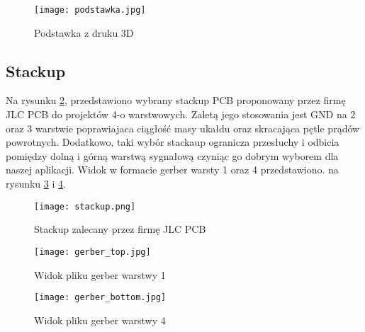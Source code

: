     \begin{figure}[H]
        \centering
        \texttt{[image: podstawka.jpg]}
        \caption{Podstawka z druku 3D}
        \label{fig:podstawka}
    \end{figure}
    
    
\subsection{Stackup}
    Na rysunku \ref{fig:stackup}, przedstawiono wybrany stackup PCB proponowany przez firmę JLC PCB do projektów 4-o warstwowych.
    Zaletą jego stosowania jest GND na 2 oraz 3 warstwie poprawiajaca ciągłość masy ukałdu oraz skracająca pętle
    prądów powrotnych. Dodatkowo, taki wybór stackaup ogranicza przesłuchy i odbicia pomiędzy dolną i górną warstwą sygnałową
    czyniąc go dobrym wyborem dla naszej aplikacji. Widok w formacie gerber warsty 1 oraz 4 przedstawiono.
    na rysunku \ref{fig:gerber_top} i \ref{fig:gerber_bottom}. 
    \begin{figure}[H]
        \centering
        \texttt{[image: stackup.png]}
        \caption{Stackup zalecany przez firmę JLC PCB}
        \label{fig:stackup}
    \end{figure}

    \begin{figure}[H]
        \centering
        \texttt{[image: gerber\_top.jpg]}
        \caption{Widok pliku gerber warstwy 1 }
        \label{fig:gerber_top}
    \end{figure}

    \begin{figure}[H]
        \centering
        \texttt{[image: gerber\_bottom.jpg]}
        \caption{Widok pliku gerber warstwy 4 }
        \label{fig:gerber_bottom}
    \end{figure}

